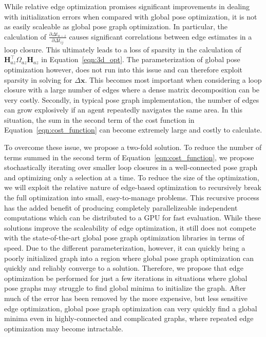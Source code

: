 While relative edge optimization promises significant improvements in dealing with initialization errors when compared with global pose optimization, it is not as easily scaleable as global pose graph optimization.  In particular, the calculation of $\frac {\partial\Delta t_{a-z}}{\partial\Delta t_{ij}}$ causes significant correlations between edge estimates in a loop closure.  This ultimately leads to a loss of sparsity in the calculation of $\mathbf{H}_{az}^\top \Omega_{az} \mathbf{H}_{az}$ in Equation~\ref{eqn:3d_opt}.  The parameterization of global pose optimization however, does not run into this issue and can therefore exploit sparsity in solving for $\Delta \mathbf{x}$.  This becomes most important when considering a loop closure with a large number of edges where a dense matrix decomposition can be very costly. Secondly, in typical pose graph implementation, the number of edges can grow explosively if an agent repeatedly navigates the same area.  In this situation, the sum in the second term of the cost function in Equation~\ref{eqn:cost_function} can become extremely large and costly to calculate.

To overcome these issue, we propose a two-fold solution.  To reduce the number of terms summed in the second term of Equation~\ref{eqn:cost_function}, we propose stochastically iterating over smaller loop closures in a well-connected pose graph and optimizing only a selection at a time.  To reduce the size of the optimization, we will exploit the relative nature of edge-based optimization to recursively break the full optimization into small, easy-to-manage problems.  This recursive process has the added benefit of producing completely parallelizeable independent computations which can be distributed to a GPU for fast evaluation.  While these solutions improve the scaleability of edge optimization, it still does not compete with the state-of-the-art global pose graph optimization libraries in terms of speed.  Due to the different parameterization, however, it can quickly bring a poorly initialized graph into a region where global pose graph optimization can quickly and reliably converge to a solution.  Therefore, we propose that edge optimization be performed for just a few iterations in situations where global pose graphs may struggle to find global minima to initialize the graph.  After much of the error has been removed by the more expensive, but less sensitive edge optimization, global pose graph optimization can very quickly find a global minima even in highly-connected and complicated graphs, where repeated edge optimization may become intractable.
